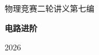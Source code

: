 \documentclass[11pt,b5paper,twoside,openany]{ctexbook}
\begin{document}
\frontmatter
\begin{titlepage}\centering\vspace*{30mm}
{\Large 物理竞赛二轮讲义\quad 第七编\par}\vspace{8mm}

{\Huge\bfseries 电路进阶\par}
\vspace{12mm}{\Large 物理竞赛二轮讲义\par}
\vspace{10mm}{\large 第一讲至第四讲\par}
\vfill{\large 2026\par}\end{titlepage}
\tableofcontents\mainmatter







\end{document}
